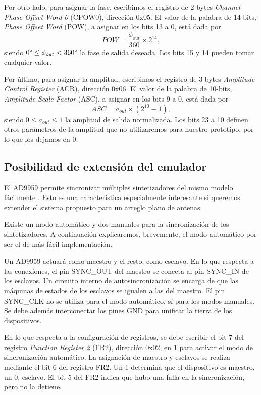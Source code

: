 \documentclass{article}
\newenvironment{standalone}{\begin{preview}}{\end{preview}}
\begin{document}
\begin{standalone}
  Por otro lado, para asignar la fase, escribimos el registro de 2-bytes \textit{Channel Phase Offset Word 0} (CPOW0), dirección 0x05.
  El valor de la palabra de 14-bits, \textit{Phase Offset Word} (POW), a asignar en los bits 13 a 0, está dada por
  \begin{equation}
    POW = \frac{\phi_{out}}{360} \times 2^{14},
  \end{equation}
  siendo $0\degree \leq \phi_{out} < 360\degree$ la fase de salida deseada.
  Los bits 15 y 14 pueden tomar cualquier valor.

  Por último, para asignar la amplitud, escribimos el registro de 3-bytes \textit{Amplitude Control Register} (ACR), dirección 0x06.
  El valor de la palabra de 10-bits, \textit{Amplitude Scale Factor} (ASC), a asignar en los bits 9 a 0, está dada por
  \begin{equation}
    ASC = a_{out} \times \left( 2^{10} - 1 \right),
  \end{equation}
  siendo $0 \leq a_{out} \leq 1$ la amplitud de salida normalizada.
  Los bits 23 a 10 definen otros parámetros de la amplitud que no utilizaremos para nuestro prototipo, por lo que los dejamos en 0.

  \subsection{Posibilidad de extensión del emulador} \label{subsec:sincronizacion}

  El AD9959 permite sincronizar múltiples sintetizadores del mismo modelo fácilmente \cite[29,30]{ad9959_datasheet}.
  Esto es una característica especialmente interesante si queremos extender el sistema propuesto para un arreglo plano de antenas.

  Existe un modo automático y dos manuales para la sincronización de los sintetizadores.
  A continuación explicaremos, brevemente, el modo automático por ser el de más fácil implementación.

  Un AD9959 actuará como maestro y el resto, como esclavo.
  En lo que respecta a las conexiones, el pin SYNC\_OUT del maestro se conecta al pin SYNC\_IN de los esclavos.
  Un circuito interno de autosincronización se encarga de que las máquinas de estados de los esclavos se igualen a las del maestro.
  El pin SYNC\_CLK no se utiliza para el modo automático, sí para los modos manuales.
  Se debe además interconectar los pines GND para unificar la tierra de los dispositivos.

  En lo que respecta a la configuración de registros, se debe escribir el bit 7 del registro \textit{Function Register 2} (FR2), dirección 0x02, en 1 para activar el modo de sincronización automático.
  La asignación de maestro y esclavos se realiza mediante el bit 6 del registro FR2.
  Un 1 determina que el dispositivo es maestro, un 0, esclavo.
  El bit 5 del FR2 indica que hubo una falla en la sincronización, pero no la detiene.


\end{standalone}
\end{document}
